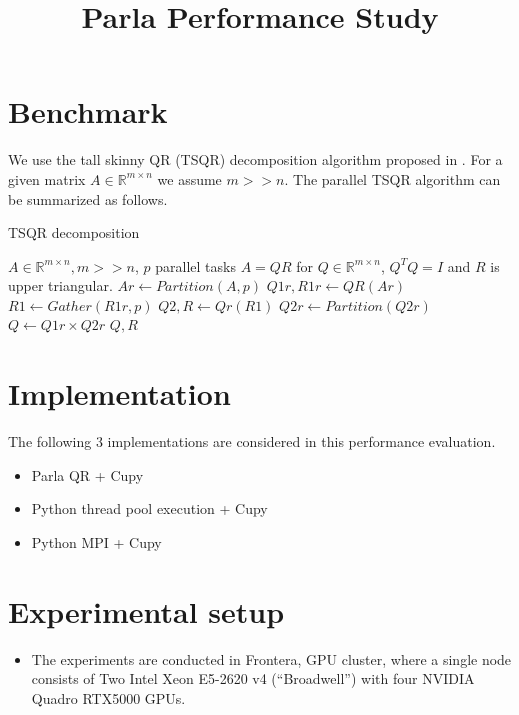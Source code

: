 \documentclass{article}
\title{Parla Performance Study}
\newcommand{\R}{\mathbb{R}}
\begin{document}
\maketitle

\section{Benchmark} 
We use the tall skinny QR (TSQR) decomposition algorithm proposed in \cite{benson2013direct,demmel2008communication}. For a given matrix $A\in \R^{m\times n}$ we assume $m>>n$. The parallel TSQR algorithm can be summarized as follows. 

\begin{algorithm}
    \caption{TSQR decomposition}
    \begin{algorithmic} 
    \REQUIRE $A \in \R^{m\times n}, m>>n$, $p$ parallel tasks
    \ENSURE $A=QR$ for $Q\in \R^{m\times n }$, $Q^TQ=I$ and $R$ is upper triangular.
    \STATE $Ar \leftarrow Partition(A,p)$
    \STATE $Q1r,R1r \leftarrow QR(Ar)$
    \STATE $R1 \leftarrow Gather(R1r,p)$
    \STATE $Q2,R \leftarrow Qr(R1)$
    \STATE $Q2r \leftarrow Partition(Q2r)$ 
    \STATE $Q\leftarrow Q1r \times Q2r$
    \RETURN $Q,R$
    \end{algorithmic}
\end{algorithm}

\section{Implementation}
The following 3 implementations are considered in this performance evaluation. 
\begin{itemize}
    \item Parla QR + Cupy
    \item Python thread pool execution + Cupy
    \item Python MPI + Cupy
\end{itemize}

\section{Experimental setup}
\begin{itemize}
    \item The experiments are conducted in Frontera, GPU cluster, where a single node consists of Two Intel Xeon E5-2620 v4 (“Broadwell”) with four NVIDIA Quadro RTX5000 GPUs.
\end{itemize}
\end{document}
